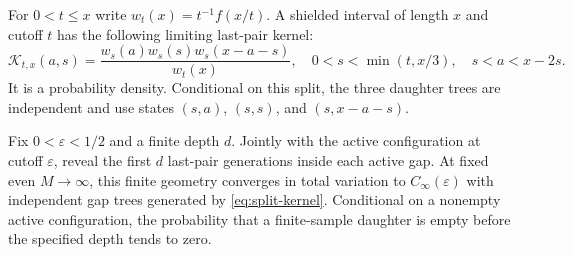 \documentclass[11pt,letterpaper]{article}
\begin{document}
\begin{lemma}
\label{lem:finite-tree-limit}
For $0<t\le x$ write $w_t(x)=t^{-1}f(x/t)$. A shielded interval of
length $x$ and cutoff $t$ has the following limiting last-pair kernel:
\begin{equation}\label{eq:split-kernel}
 \mathcal K_{t,x}(a,s)
   =\frac{w_s(a)w_s(s)w_s(x-a-s)}{w_t(x)},\quad
 0<s<\min(t,x/3),\quad s<a<x-2s.
\end{equation}
It is a probability density. Conditional on this split, the three
daughter trees are independent and use states $(s,a)$, $(s,s)$, and
$(s,x-a-s)$.

Fix $0<\varepsilon<1/2$ and a finite depth $d$. Jointly with the active
configuration at cutoff $\varepsilon$, reveal the first $d$ last-pair
generations inside each active gap. At fixed even $M\to\infty$, this
finite geometry converges in total variation to
$C_\infty(\varepsilon)$ with independent gap trees generated by
\eqref{eq:split-kernel}. Conditional on a nonempty active configuration,
the probability that a finite-sample daughter is empty before the
specified depth tends to zero.
\end{lemma}
\end{document}
